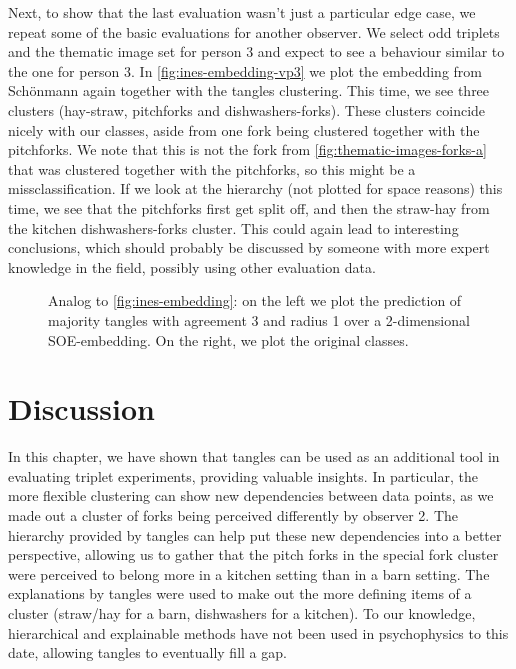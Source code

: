Next, to show that the last evaluation wasn't just a particular edge case, we repeat some of the basic evaluations for another observer.
We select odd triplets and the thematic image set for person 3 and expect to see a behaviour similar to the one for person 3. In \autoref{fig:ines-embedding-vp3} we plot the embedding
from Schönmann again together with the tangles clustering. This time, we see three clusters (hay-straw, pitchforks and dishwashers-forks). These clusters coincide nicely
with our classes, aside from one fork being clustered together with the pitchforks. We note that this is not the fork from \autoref{fig:thematic-images-forks-a} that was clustered together 
with the pitchforks, so this might be a missclassification. 
If we look at the hierarchy (not plotted for space reasons) this time, we see that the pitchforks first get split off, and then the straw-hay from the kitchen dishwashers-forks cluster.
This could again lead to interesting conclusions, which should probably be discussed by someone with more expert knowledge in the field, possibly using other evaluation data.

\onecolumn
\begin{figure}[ht]
    \centering
    \caption{
        Analog to \autoref{fig:ines-embedding}: on the left we plot the prediction of majority tangles with agreement 3 and radius 1 over 
        a 2-dimensional SOE-embedding. On the right, we plot the original classes.
    }
    \label{fig:ines-embedding-vp3}
\end{figure}


\section{Discussion}
In this chapter, we have shown that tangles can be used as an additional tool in evaluating 
triplet experiments, providing valuable insights. In particular, the more flexible clustering 
can show new dependencies between data points, as we 
made out a cluster of forks being perceived differently by observer 2. The hierarchy 
provided by tangles can help put these new dependencies into a better perspective, 
allowing us to gather that the pitch forks in the special fork cluster were perceived to 
belong more in a kitchen setting than in a barn setting.
The explanations by tangles were used to make out the more defining items of a cluster (straw/hay for
a barn, dishwashers for a kitchen). To our knowledge, hierarchical and explainable methods
have not been used in psychophysics to this date, allowing tangles to eventually fill 
a gap.

